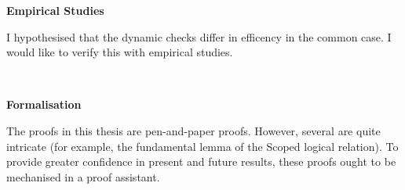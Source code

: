 \noindent\begin{minipage}[t]{0.25\textwidth}
  \textbf{\textsf{Empirical Studies}}
\end{minipage}%
\begin{minipage}[t]{0.75\textwidth}
  I hypothesised that the dynamic checks differ in efficency in the common case. I would like to verify this with empirical studies.

  \vspace{4mm}
\end{minipage}\\

\noindent\begin{minipage}[t]{0.25\textwidth}
  \textbf{\textsf{Formalisation}}
\end{minipage}%
\begin{minipage}[t]{0.75\textwidth}
  The proofs in this thesis are pen-and-paper proofs. However, several are quite intricate (for example, the fundamental lemma of the \textsf{Scoped} logical relation). To provide greater confidence in present and future results, these proofs ought to be mechanised in a proof assistant.
\end{minipage}







